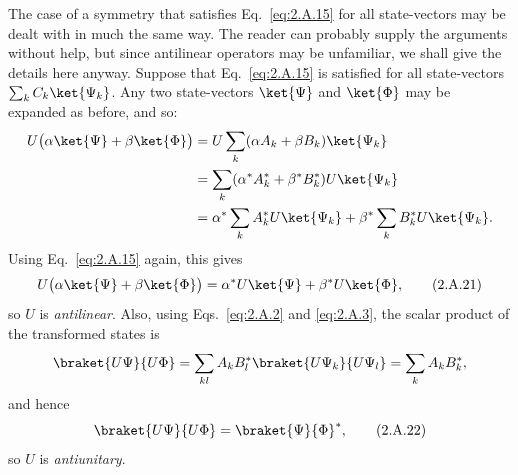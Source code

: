 The case of a symmetry that satisfies Eq.~\eqref{eq:2.A.15} for all state-vectors
may be dealt with in much the same way. The reader can probably supply the
arguments without help, but since antilinear operators may be unfamiliar,
we shall give the details here anyway. Suppose that Eq.~\eqref{eq:2.A.15} is
satisfied for all state-vectors $\sum_k C_k\ket{\Psi_k}$. Any two
state-vectors $\ket{\Psi}$ and $\ket{\Phi}$ may be expanded as before, and
so:
\begin{align*}
  U\bigl(\alpha\ket{\Psi}+\beta\ket{\Phi}\bigr)
  &=U\sum_k(\alpha A_k+\beta B_k)\ket{\Psi_k}\\
  &=\sum_k(\alpha^*A_k^*+\beta^*B_k^*)U\ket{\Psi_k}\\
  &=\alpha^*\sum_k A_k^*U\ket{\Psi_k}
    +\beta^*\sum_k B_k^*U\ket{\Psi_k}.
\end{align*}
Using Eq.~\eqref{eq:2.A.15} again, this gives
\begin{equation}
  U\bigl(\alpha\ket{\Psi}+\beta\ket{\Phi}\bigr)
    =\alpha^*U\ket{\Psi}+\beta^*U\ket{\Phi},
  \tag{2.A.21}\label{eq:2.A.21}
\end{equation}
so $U$ is \emph{antilinear}. Also, using Eqs.~\eqref{eq:2.A.2} and \eqref{eq:2.A.3}, the
scalar product of the transformed states is
\begin{equation*}
  \braket{U\Psi}{U\Phi}
    =\sum_{kl}A_k B_l^*\braket{U\Psi_k}{U\Psi_l}
    =\sum_k A_k B_k^*,
\end{equation*}
and hence
\begin{equation}
  \braket{U\Psi}{U\Phi}=\braket{\Psi}{\Phi}^{*},
  \tag{2.A.22}\label{eq:2.A.22}
\end{equation}
so $U$ is \emph{antiunitary}.
